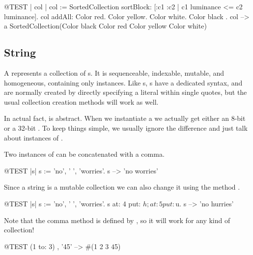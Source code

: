 \documentclass[a4paper,10pt,twoside]{book}
\begin{document}
\begin{code}{@TEST | col |}
col := SortedCollection sortBlock: [:c1 :c2 | c1 luminance <= c2 luminance].
col addAll: { Color red. Color yellow. Color white. Color black }.
col --> a SortedCollection(Color black Color red Color yellow Color white)
\end{code}

\subsection{String}
A \st {} represents a collection of s.
It is sequenceable, indexable, mutable, and homogeneous, containing only  instances.
Like s, s have a dedicated syntax, and are normally created by directly specifying a  literal within single quotes, but the usual collection creation methods will work as well.


In actual fact,  is abstract.
When we instantiate a  we actually get either an 8-bit  or a 32-bit .
To keep things simple, we usually ignore the difference and just talk about instances of .

Two instances of  can be concatenated with a comma.
\begin{code}{@TEST |s|}
s := 'no', ' ', 'worries'.
s -->  'no worries'
\end{code}

Since a string is a mutable collection we can also change it using the method .

\begin{code}{@TEST |s| s := 'no', ' ', 'worries'.}
s at: 4 put: $h; at: 5 put: $u.
s --> 'no hurries'
\end{code}

Note that the comma method is defined by , so it will work for any kind of collection!
\begin{code}{@TEST}
(1 to: 3) , '45' --> #(1 2 3 $4 $5)
\end{code}
\end{document}
